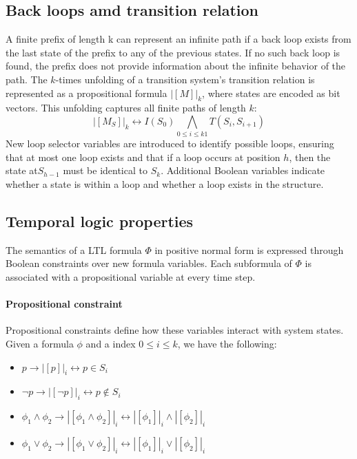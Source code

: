 \subsection{Back loops amd transition relation}
A finite prefix of length k can represent an infinite path if a back loop exists from the last state of the prefix to any of the previous states. 
If no such back loop is found, the prefix does not provide information about the infinite behavior of the path. 
The $k$-times unfolding of a transition system's transition relation is represented as a propositional formula ${\left\lvert [M]\right\rvert}_k$, where states are encoded as bit vectors.
This unfolding captures all finite paths of length $k$: 
\[{\left\lvert [M_S]\right\rvert}_k\leftrightarrow I(S_0)\bigwedge_{0\leq i \leq k1}T(S_i,S_{i+1}) \]
New loop selector variables are introduced to identify possible loops, ensuring that at most one loop exists and that if a loop occurs at position $h$, then the state at$S_{h-1}$ must be identical to $S_k$. 
Additional Boolean variables indicate whether a state is within a loop and whether a loop exists in the structure.

\subsection{Temporal logic properties}
The semantics of a LTL formula $\Phi$ in positive normal form is expressed through Boolean constraints over new formula variables.
Each subformula of $\Phi$  is associated with a propositional variable at every time step.

\paragraph*{Propositional constraint}
Propositional constraints define how these variables interact with system states.
Given a formula $\phi$ and a index $0\leq i\leq k$, we have the following: 
\begin{itemize}
    \item $p\rightarrow{\left\lvert [p]\right\rvert}_i\leftrightarrow p\in S_i$
    \item $\lnot p\rightarrow{\left\lvert [\lnot p]\right\rvert}_i\leftrightarrow p\notin S_i$
    \item $\phi_1\land\phi_2\rightarrow{\left\lvert [\phi_1\land\phi_2]\right\rvert}_i\leftrightarrow{\left\lvert [\phi_1]\right\rvert}_i\land {\left\lvert [\phi_2]\right\rvert}_i$
    \item $\phi_1\lor\phi_2\rightarrow{\left\lvert [\phi_1\lor\phi_2]\right\rvert}_i\leftrightarrow{\left\lvert [\phi_1]\right\rvert}_i\lor {\left\lvert [\phi_2]\right\rvert}_i$
\end{itemize}

